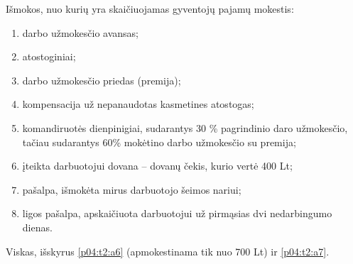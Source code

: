 \begin{tasks}
  \begin{task}
    \begin{condition}
      Išmokos, nuo kurių yra skaičiuojamas gyventojų pajamų mokestis:
      \begin{enumerate}
        \item \label{p04:t2:a1} darbo užmokesčio avansas;
        \item \label{p04:t2:a2} atostoginiai;
        \item \label{p04:t2:a3} darbo užmokesčio priedas (premija);
        \item \label{p04:t2:a4} kompensacija už nepanaudotas kasmetines
          atostogas;
        \item \label{p04:t2:a5} komandiruotės dienpinigiai, sudarantys
          30 \% pagrindinio daro užmokesčio, tačiau sudarantys 60\%
          mokėtino darbo užmokesčio su premija;
        \item \label{p04:t2:a6} įteikta darbuotojui dovana – dovanų
          čekis, kurio vertė 400 Lt;
        \item \label{p04:t2:a7} pašalpa, išmokėta mirus darbuotojo
          šeimos nariui;
        \item \label{p04:t2:a8} ligos pašalpa, apskaičiuota
          darbuotojui už pirmąsias dvi nedarbingumo dienas.
      \end{enumerate}
      \begin{solution}
        Viskas, išskyrus \ref{p04:t2:a6} (apmokestinama tik nuo 700 Lt)
        ir \ref{p04:t2:a7}.
      \end{solution}
    \end{condition}
  \end{task}


\end{tasks}
